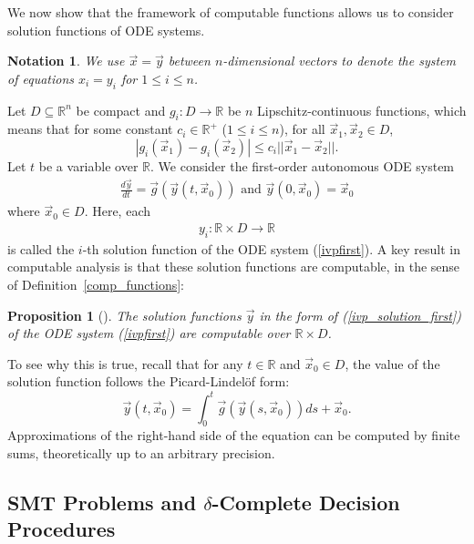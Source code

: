 \documentclass[12pt]{article}
\newtheorem{proposition}[theorem]{Proposition}
\newtheorem{notation}[theorem]{Notation}
\begin{document}
We now show that the framework of computable functions allows us to consider solution functions of ODE systems.
\begin{notation}
We use $\vec x= \vec y$ between $n$-dimensional vectors to denote the system of equations $x_i=y_i$ for $1\leq i\leq n$.
\end{notation}
Let $D\subseteq \mathbb{R}^n$ be compact and $g_i: D\rightarrow \mathbb{R}$ be $n$ Lipschitz-continuous functions, which means that for some constant $c_i\in \mathbb{R}^+$ ($1 \leq i \leq n$), for all
 $\vec x_1, \vec x_2\in D$,
$$|g_i(\vec x_1)-g_i(\vec x_2)|\leq c_i||\vec x_1-\vec x_2||.$$
Let $t$ be a variable over $\mathbb{R}$. We consider the first-order autonomous ODE system
\begin{eqnarray}\label{ivpfirst}
\frac{d \vec y}{dt} = \vec g(\vec y(t, \vec x_0)) \mbox{ and }\vec y(0, \vec x_0) = \vec x_0
\end{eqnarray}
where $\vec x_0\in D$. Here, each
\begin{eqnarray}\label{ivp_solution_first}
y_i: \mathbb{R}\times D\rightarrow \mathbb{R}
\end{eqnarray}
is called the $i$-th solution function of the ODE system (\ref{ivpfirst}). A key result in computable analysis is that these solution functions are computable, in the sense of Definition~\ref{comp_functions}: 
\begin{proposition}[\cite{Kobook}]
The solution functions $\vec y$ in the form of (\ref{ivp_solution_first}) of the ODE system (\ref{ivpfirst}) are computable over $\mathbb{R}\times D$.
\end{proposition}
To see why this is true, recall that for any $t\in\mathbb{R}$ and $\vec x_0\in D$, the value of the solution function follows the Picard-Lindel\"of form:
$$\vec y(t,\vec x_0) = \int_{0}^t \vec g(\vec y(s,\vec x_0))ds + \vec x_0.$$
Approximations of the right-hand side of the equation can be computed by finite sums, theoretically up to an arbitrary precision.

\subsection{SMT Problems and $\delta$-Complete Decision Procedures}
\end{document}
